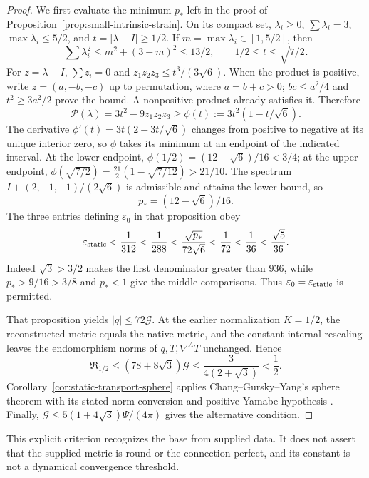 \documentclass[11pt]{article}
\numberwithin{equation}{section}
\theoremstyle{definition}
\theoremstyle{remark}
\begin{document}
\begin{proof}
We first evaluate the minimum $p_*$ left in the proof of
Proposition~\ref{prop:small-intrinsic-strain}. On its compact set,
$\lambda_i\ge0$, $\sum\lambda_i=3$, $\max\lambda_i\le5/2$, and
$t=|\lambda-I|\ge1/2$. If $m=\max\lambda_i\in[1,5/2]$, then
\[
 \sum\lambda_i^2\le m^2+(3-m)^2\le13/2,
 \qquad 1/2\le t\le\sqrt{7/2}.
\]
For $z=\lambda-I$, $\sum z_i=0$ and
$z_1z_2z_3\le t^3/(3\sqrt6)$. When the product is positive,
write $z=(a,-b,-c)$ up to permutation, where $a=b+c>0$;
$b c\le a^2/4$ and $t^2\ge3a^2/2$ prove the bound. A nonpositive
product already satisfies it. Therefore
\[
 \mathcal P(\lambda)=3t^2-9z_1z_2z_3
       \ge\phi(t):=3t^2(1-t/\sqrt6).
\]
The derivative $\phi'(t)=3t(2-3t/\sqrt6)$ changes from positive
to negative at its unique interior zero, so $\phi$ takes its minimum
at an endpoint of the indicated interval. At the lower endpoint,
$\phi(1/2)=(12-\sqrt6)/16<3/4$; at the upper endpoint,
$\phi(\sqrt{7/2})=\tfrac{21}{2}(1-\sqrt{7/12})>21/10$.
The spectrum $I+(2,-1,-1)/(2\sqrt6)$ is admissible and attains
the lower bound, so
\[
 p_*=(12-\sqrt6)/16.
\]
The three entries defining $\varepsilon_0$ in that proposition obey
\[
 \varepsilon_{\rm static}<\frac1{312}<\frac1{288}
 <\frac{\sqrt{p_*}}{72\sqrt6}<\frac1{72}
 <\frac1{36}<\frac{\sqrt5}{36}.
\]
Indeed $\sqrt3>3/2$ makes the first denominator greater than $936$,
while $p_*>9/16>3/8$ and $p_*<1$ give the middle comparisons.
Thus $\varepsilon_0=\varepsilon_{\rm static}$ is permitted.

That proposition yields $|q|\le72\mathcal G$. At the earlier
normalization $K=1/2$, the reconstructed metric equals the native
metric, and the constant internal rescaling leaves the endomorphism
norms of $q,T,\nabla^AT$ unchanged. Hence
\[
 \mathfrak R_{1/2}
 \le(78+8\sqrt3)\mathcal G
 \le\frac{3}{4(2+\sqrt3)}<\frac12.
\]
Corollary~\ref{cor:static-transport-sphere} applies Chang--Gursky--Yang's
sphere theorem with its stated norm conversion and positive Yamabe
hypothesis \cite[Theorem A and Remarks 1--2]{ChangGurskyYang2003}.
Finally, $\mathcal G\le5(1+4\sqrt3)\Psi/(4\pi)$ gives the alternative
condition.
\end{proof}

This explicit criterion recognizes the base from supplied data. It does
not assert that the supplied metric is round or the connection perfect,
and its constant is not a dynamical convergence threshold.
\end{document}
